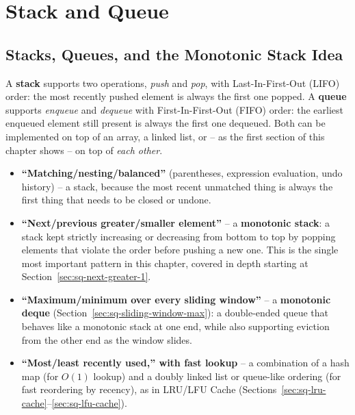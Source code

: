 \chapter{Stack and Queue}

\section{Stacks, Queues, and the Monotonic Stack Idea}
\label{sec:sq-intro}

A \textbf{stack} supports two operations, \textit{push} and \textit{pop},
with Last-In-First-Out (LIFO) order: the most recently pushed element is
always the first one popped. A \textbf{queue} supports \textit{enqueue}
and \textit{dequeue} with First-In-First-Out (FIFO) order: the earliest
enqueued element still present is always the first one dequeued. Both can
be implemented on top of an array, a linked list, or -- as the first
section of this chapter shows -- on top of \emph{each other}.

\begin{patternbox}
\begin{itemize}
  \item \textbf{``Matching/nesting/balanced''} (parentheses, expression
        evaluation, undo history) -- a stack, because the most recent
        unmatched thing is always the first thing that needs to be closed
        or undone.
  \item \textbf{``Next/previous greater/smaller element''} -- a
        \textbf{monotonic stack}: a stack kept strictly increasing or
        decreasing from bottom to top by popping elements that violate
        the order before pushing a new one. This is the single most
        important pattern in this chapter, covered in depth starting at
        Section~\ref{sec:sq-next-greater-1}.
  \item \textbf{``Maximum/minimum over every sliding window''} -- a
        \textbf{monotonic deque} (Section~\ref{sec:sq-sliding-window-max}):
        a double-ended queue that behaves like a monotonic stack at one
        end, while also supporting eviction from the other end as the
        window slides.
  \item \textbf{``Most/least recently used,'' with fast lookup} -- a
        combination of a hash map (for $O(1)$ lookup) and a doubly linked
        list or queue-like ordering (for fast reordering by recency), as
        in LRU/LFU Cache (Sections~\ref{sec:sq-lru-cache}--\ref{sec:sq-lfu-cache}).
\end{itemize}
\end{patternbox}


